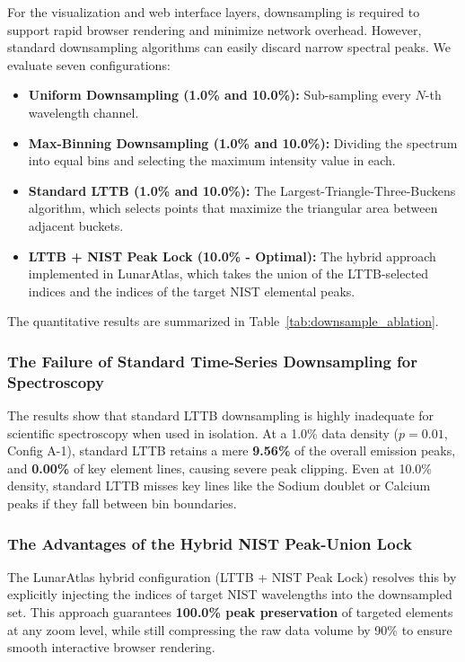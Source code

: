 For the visualization and web interface layers, downsampling is required to support rapid browser rendering and minimize network overhead. However, standard downsampling algorithms can easily discard narrow spectral peaks. We evaluate seven configurations:
\begin{itemize}
    \item \textbf{Uniform Downsampling (1.0\% and 10.0\%):} Sub-sampling every $N$-th wavelength channel.
    \item \textbf{Max-Binning Downsampling (1.0\% and 10.0\%):} Dividing the spectrum into equal bins and selecting the maximum intensity value in each.
    \item \textbf{Standard LTTB (1.0\% and 10.0\%):} The Largest-Triangle-Three-Buckens algorithm, which selects points that maximize the triangular area between adjacent buckets.
    \item \textbf{LTTB + NIST Peak Lock (10.0\% - Optimal):} The hybrid approach implemented in LunarAtlas, which takes the union of the LTTB-selected indices and the indices of the target NIST elemental peaks.
\end{itemize}

The quantitative results are summarized in Table~\ref{tab:downsample_ablation}.

\subsubsection{The Failure of Standard Time-Series Downsampling for Spectroscopy}
The results show that standard LTTB downsampling is highly inadequate for scientific spectroscopy when used in isolation. At a 1.0\% data density ($p=0.01$, Config A-1), standard LTTB retains a mere \textbf{9.56\%} of the overall emission peaks, and \textbf{0.00\%} of key element lines, causing severe peak clipping. Even at 10.0\% density, standard LTTB misses key lines like the Sodium doublet or Calcium peaks if they fall between bin boundaries.

\subsubsection{The Advantages of the Hybrid NIST Peak-Union Lock}
The LunarAtlas hybrid configuration (LTTB + NIST Peak Lock) resolves this by explicitly injecting the indices of target NIST wavelengths into the downsampled set. This approach guarantees \textbf{100.0\% peak preservation} of targeted elements at any zoom level, while still compressing the raw data volume by 90\% to ensure smooth interactive browser rendering.
